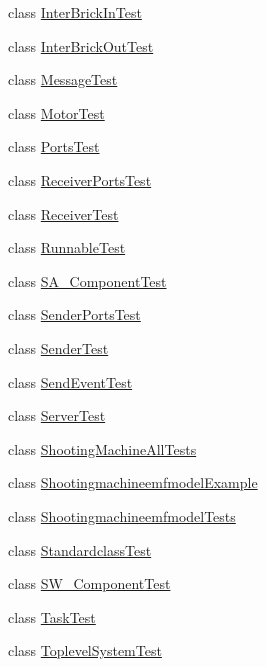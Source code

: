 \begin{DoxyCompactItemize}
\item 
class \hyperlink{classshootingmachineemfmodel_1_1tests_1_1_inter_brick_in_test}{Inter\-Brick\-In\-Test}
\item 
class \hyperlink{classshootingmachineemfmodel_1_1tests_1_1_inter_brick_out_test}{Inter\-Brick\-Out\-Test}
\item 
class \hyperlink{classshootingmachineemfmodel_1_1tests_1_1_message_test}{Message\-Test}
\item 
class \hyperlink{classshootingmachineemfmodel_1_1tests_1_1_motor_test}{Motor\-Test}
\item 
class \hyperlink{classshootingmachineemfmodel_1_1tests_1_1_ports_test}{Ports\-Test}
\item 
class \hyperlink{classshootingmachineemfmodel_1_1tests_1_1_receiver_ports_test}{Receiver\-Ports\-Test}
\item 
class \hyperlink{classshootingmachineemfmodel_1_1tests_1_1_receiver_test}{Receiver\-Test}
\item 
class \hyperlink{classshootingmachineemfmodel_1_1tests_1_1_runnable_test}{Runnable\-Test}
\item 
class \hyperlink{classshootingmachineemfmodel_1_1tests_1_1_s_a___component_test}{S\-A\-\_\-\-Component\-Test}
\item 
class \hyperlink{classshootingmachineemfmodel_1_1tests_1_1_sender_ports_test}{Sender\-Ports\-Test}
\item 
class \hyperlink{classshootingmachineemfmodel_1_1tests_1_1_sender_test}{Sender\-Test}
\item 
class \hyperlink{classshootingmachineemfmodel_1_1tests_1_1_send_event_test}{Send\-Event\-Test}
\item 
class \hyperlink{classshootingmachineemfmodel_1_1tests_1_1_server_test}{Server\-Test}
\item 
class \hyperlink{classshootingmachineemfmodel_1_1tests_1_1_shooting_machine_all_tests}{Shooting\-Machine\-All\-Tests}
\item 
class \hyperlink{classshootingmachineemfmodel_1_1tests_1_1_shootingmachineemfmodel_example}{Shootingmachineemfmodel\-Example}
\item 
class \hyperlink{classshootingmachineemfmodel_1_1tests_1_1_shootingmachineemfmodel_tests}{Shootingmachineemfmodel\-Tests}
\item 
class \hyperlink{classshootingmachineemfmodel_1_1tests_1_1_standardclass_test}{Standardclass\-Test}
\item 
class \hyperlink{classshootingmachineemfmodel_1_1tests_1_1_s_w___component_test}{S\-W\-\_\-\-Component\-Test}
\item 
class \hyperlink{classshootingmachineemfmodel_1_1tests_1_1_task_test}{Task\-Test}
\item 
class \hyperlink{classshootingmachineemfmodel_1_1tests_1_1_toplevel_system_test}{Toplevel\-System\-Test}
\end{DoxyCompactItemize}
